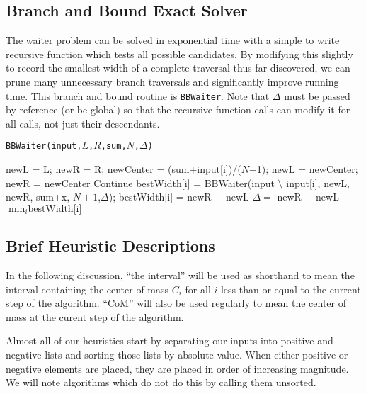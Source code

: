\documentclass[11pt,twocolumn]{article}
\begin{document}
\subsection{Branch and Bound Exact Solver}

The waiter problem can be solved in exponential time with a simple to write recursive function which tests all possible candidates.  By modifying this slightly to record the smallest width of a complete traversal thus far discovered, we can prune many unnecessary branch traversals and significantly improve running time.  This branch and bound routine is \texttt{BBWaiter}.  Note that $\Delta$ must be passed by reference (or be global) so that the recursive function calls can modify it for all calls, not just their descendants.

\begin{algorithm}
\caption{ \texttt{BBWaiter(input,$L$,$R$,sum,$N$,$\Delta$)} }
\label{alg:bbExhaustive}
\begin{algorithmic}
  \State newL = L;
  \State newR = R;
  \State newCenter = (sum+input[i])/($N$+1);
  \State newL = newCenter;
  \EndIf
  \State newR = newCenter
  \EndIf
  \State Continue
  \EndIf
  \State bestWidth[i] = BBWaiter(input $\setminus$ input[i], newL, newR, sum+x, $N+1$,$\Delta$);
  \Else
  \State bestWidth[i] = newR $-$ newL
  \EndIf
  \State $\Delta = $ newR $-$ newL
  \EndIf
\EndFor
\State \Return $\min_i {\textrm{bestWidth[i]}}$  
\end{algorithmic}
\end{algorithm}

\FloatBarrier
\subsection{Brief Heuristic Descriptions}

In the following discussion, ``the interval'' will be used as shorthand to mean the interval containing the center of mass $C_i$ for all $i$ less than or equal to the current step of the algorithm. ``CoM'' will also be used regularly to mean the center of mass at the curent step of the algorithm.

Almost all of our heuristics start by separating our inputs into positive and negative lists and sorting those lists by absolute value.  When either positive or negative elements are placed, they are placed in order of increasing magnitude. We will note algorithms which do not do this by calling them unsorted.
\end{document}
